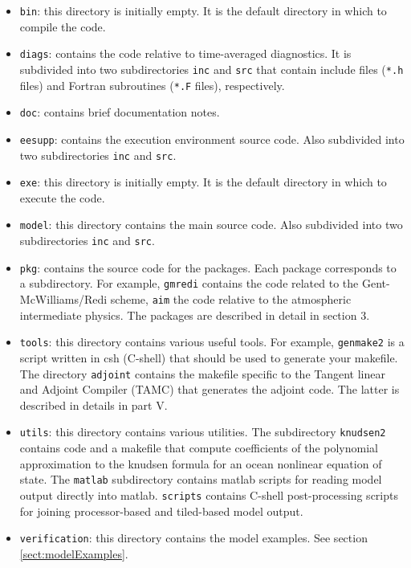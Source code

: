 \begin{itemize}

\item \texttt{bin}: this directory is initially empty. It is the
  default directory in which to compile the code.
  
\item \texttt{diags}: contains the code relative to time-averaged
  diagnostics. It is subdivided into two subdirectories \texttt{inc}
  and \texttt{src} that contain include files (\texttt{*.h} files) and
  Fortran subroutines (\texttt{*.F} files), respectively.

\item \texttt{doc}: contains brief documentation notes.
  
\item \texttt{eesupp}: contains the execution environment source code.
  Also subdivided into two subdirectories \texttt{inc} and
  \texttt{src}.
  
\item \texttt{exe}: this directory is initially empty. It is the
  default directory in which to execute the code.
  
\item \texttt{model}: this directory contains the main source code.
  Also subdivided into two subdirectories \texttt{inc} and
  \texttt{src}.
  
\item \texttt{pkg}: contains the source code for the packages. Each
  package corresponds to a subdirectory. For example, \texttt{gmredi}
  contains the code related to the Gent-McWilliams/Redi scheme,
  \texttt{aim} the code relative to the atmospheric intermediate
  physics. The packages are described in detail in section 3.
  
\item \texttt{tools}: this directory contains various useful tools.
  For example, \texttt{genmake2} is a script written in csh (C-shell)
  that should be used to generate your makefile. The directory
  \texttt{adjoint} contains the makefile specific to the Tangent
  linear and Adjoint Compiler (TAMC) that generates the adjoint code.
  The latter is described in details in part V.
  
\item \texttt{utils}: this directory contains various utilities. The
  subdirectory \texttt{knudsen2} contains code and a makefile that
  compute coefficients of the polynomial approximation to the knudsen
  formula for an ocean nonlinear equation of state. The
  \texttt{matlab} subdirectory contains matlab scripts for reading
  model output directly into matlab. \texttt{scripts} contains C-shell
  post-processing scripts for joining processor-based and tiled-based
  model output.
  
\item \texttt{verification}: this directory contains the model
  examples. See section \ref{sect:modelExamples}.

\end{itemize}

